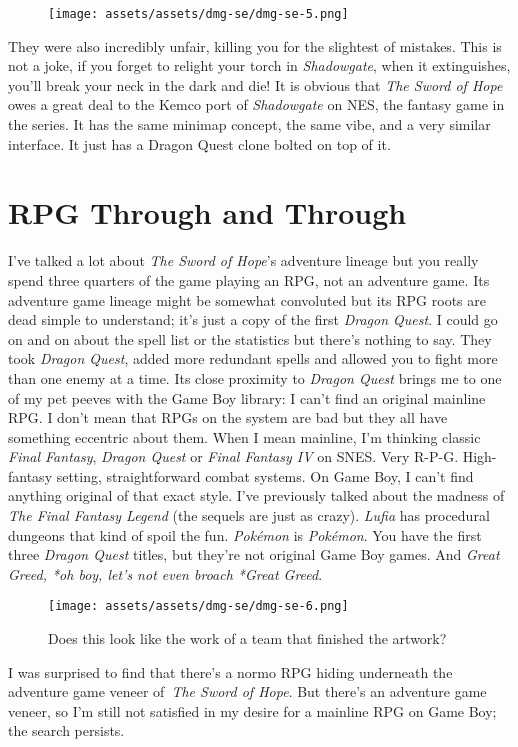 \documentclass{book}
\begin{document}
\begin{figure}[hbt]
\vskip 10pt
\centering \texttt{[image: assets/assets/dmg-se/dmg-se-5.png]}
\vskip 6pt
\end{figure}
They were also incredibly unfair, killing you for the slightest of mistakes. This is not a joke, if you forget to relight your torch in \emph{Shadowgate}, when it extinguishes, you’ll break your neck in the dark and die! It is obvious that \emph{The Sword of Hope} owes a great deal to the Kemco port of \emph{Shadowgate} on NES, the fantasy game in the series. It has the same minimap concept, the same vibe, and a very similar interface. It just has a Dragon Quest clone bolted on top of it.

\FloatBarrier\needspace{5pt}\section*{RPG Through and Through}\nopagebreak[4]

I’ve talked a lot about \emph{The Sword of Hope}’s adventure lineage but you really spend three quarters of the game playing an RPG, not an adventure game. Its adventure game lineage might be somewhat convoluted but its RPG roots are dead simple to understand; it’s just a copy of the first \emph{Dragon Quest}. I could go on and on about the spell list or the statistics but there’s nothing to say. They took \emph{Dragon Quest}, added more redundant spells and allowed you to fight more than one enemy at a time. Its close proximity to \emph{Dragon Quest} brings me to one of my pet peeves with the Game Boy library: I can’t find an original mainline RPG. I don’t mean that RPGs on the system are bad but they all have something eccentric about them. When I mean mainline, I’m thinking classic \emph{Final Fantasy}, \emph{Dragon Quest} or \emph{Final Fantasy IV} on SNES. Very R-P-G. High-fantasy setting, straightforward combat systems. On Game Boy, I can’t find anything original of that exact style. I’ve previously talked about the madness of \emph{The Final Fantasy Legend} (the sequels are just as crazy). \emph{Lufia} has procedural dungeons that kind of spoil the fun. \emph{Pokémon} is \emph{Pokémon}. You have the first three \emph{Dragon Quest} titles, but they’re not original Game Boy games. And \emph{Great Greed, *oh boy, let’s not even broach *Great Greed}.

\begin{figure}[hbt]
\vskip 10pt
\centering \texttt{[image: assets/assets/dmg-se/dmg-se-6.png]}\par\pagetwodescription Does this look like the work of a team that finished the artwork?
\vskip 6pt
\end{figure}
I was surprised to find that there’s a normo RPG hiding underneath the adventure game veneer of \emph{The Sword of Hope}. But there’s an adventure game veneer, so I’m still not satisfied in my desire for a mainline RPG on Game Boy; the search persists.
\end{document}
